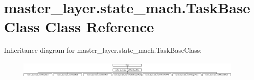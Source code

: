 \hypertarget{classmaster__layer_1_1state__mach_1_1TaskBaseClass}{}\section{master\+\_\+layer.\+state\+\_\+mach.\+Task\+Base\+Class Class Reference}
\label{classmaster__layer_1_1state__mach_1_1TaskBaseClass}
Inheritance diagram for master\+\_\+layer.\+state\+\_\+mach.\+Task\+Base\+Class\+:\begin{figure}[H]
\begin{center}
\leavevmode
\includegraphics[height=0.863309cm]{classmaster__layer_1_1state__mach_1_1TaskBaseClass}
\end{center}
\end{figure}
